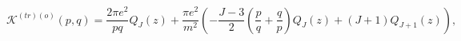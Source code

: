 \begin{equation}
\mathcal{K}^{\left( tr\right) \left( o\right) }(p,q)=\frac{2\pi e^{2}}{pq}%
Q_{J}\left( z\right) +\frac{\pi e^{2}}{m^{2}}\left( -\frac{J-3}{2}\left( 
\frac{p}{q}+\frac{q}{p}\right) Q_{J}\left( z\right) +\left( J+1\right)
Q_{J+1}\left( z\right) \right) ,
\end{equation}


